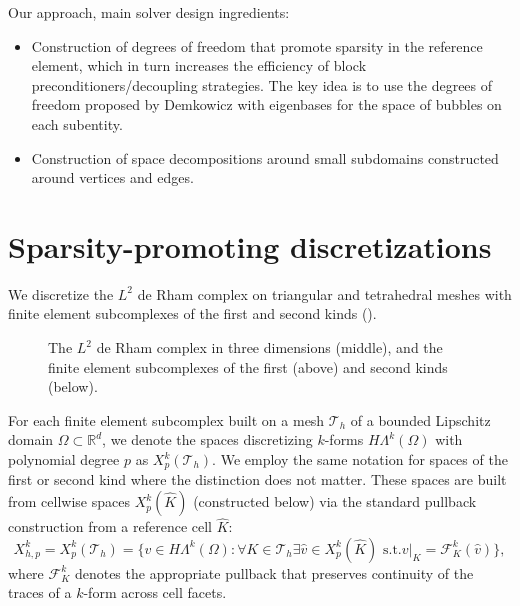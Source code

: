 \documentclass[review,onefignum,onetabnum,a4paper]{siamart190516}
\let\grad\undefined
\let\curl\undefined
\let\div\undefined
\DeclareMathOperator{\grad}{grad}
\DeclareMathOperator{\curl}{curl}
\DeclareMathOperator{\div}{div}
\DeclareMathOperator{\Exists}{\exists}
\DeclareMathOperator{\Forall}{\forall}
\newcommand{\Hgrad}{H(\grad)}
\newcommand{\Hcurl}{H(\curl)}
\newcommand{\Hdiv}{H(\div)}
\newcommand{\Ltwo}{L^2}
\newcommand{\mesh}{\mathcal{T}_h}
\newcommand{\pullback}{\mathcal{F}}
\newcommand{\Khat}{\hat{K}}
\newcommand{\CG}{\mathrm{CG}}
\newcommand{\DG}{\mathrm{DG}}
\newcommand{\Ned}{\mathrm{Ned}^{1}}
\newcommand{\RT}{\mathrm{RT}}
\newcommand{\BDM}{\mathrm{BDM}}
\newcommand{\NedTwo}{\mathrm{Ned}^{2}}
\newcommand{\pef}[1]{\todo[inline,color=blue!40]{PEF: #1}}
\begin{document}
Our approach, main solver design ingredients:
\begin{itemize}
\item Construction of degrees of freedom that promote sparsity in the reference element, 
   which in turn increases the efficiency of block preconditioners/decoupling strategies. The key idea is
      to use the degrees of freedom proposed by Demkowicz with eigenbases for the space of bubbles on each subentity.
\item Construction of space decompositions around small subdomains constructed around vertices and edges.
\end{itemize}



\section{Sparsity-promoting discretizations} \label{sec:dofs}

We discretize the $\Ltwo$ de Rham complex on triangular and tetrahedral meshes with finite element subcomplexes of the first and second kinds ().

\begin{figure}[htbp] 
\centering
{}
\caption{The $\Ltwo$ de Rham complex in three dimensions (middle), and the finite element subcomplexes of the first (above) and second kinds (below).}
\label{fig:3DL2deRham}
\end{figure}
\pef{Fix vertical alignment}

For each finite element subcomplex built on a mesh $\mesh$ of a bounded Lipschitz domain $\Omega \subset \mathbb{R}^d$, we denote the spaces discretizing $k$-forms $H\Lambda^k(\Omega)$ with polynomial degree $p$ as $X^k_p(\mesh)$. We employ the same notation for spaces of the first or second kind where the distinction does not matter.
These spaces are built from cellwise spaces $X^k_p(\Khat)$ (constructed below) via the standard pullback construction from a reference cell $\Khat$:
\begin{equation}
X^k_{h,p} = X^k_p(\mesh) = \{ v \in H\Lambda^k(\Omega): \Forall K \in \mesh \Exists \hat{v} \in X^k_p(\Khat) \text{ s.t.} \left.v\right|_K = \pullback^k_K(\hat{v}) \},
\end{equation}
where $\pullback^k_K$ denotes the appropriate pullback that preserves continuity of the traces of a $k$-form across cell facets.
\end{document}
